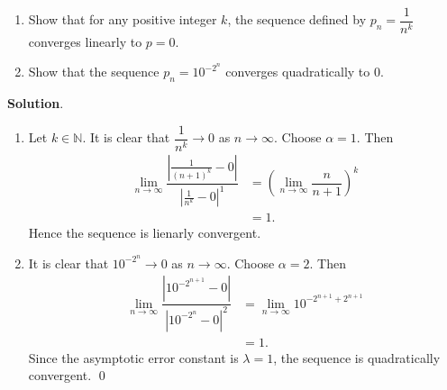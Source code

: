 \documentclass[11pt]{article}
\theoremstyle{break}
\numberwithin{equation}{theorem}
\begin{document}
\newpage
\begin{problem}\label{problem 9}$\ $
    \begin{enumerate}
        \item Show that for any positive integer $k$, the sequence defined by $p_n=\dfrac{1}{n^k}$ converges linearly to $p=0$.
        \item Show that the sequence $p_n=10^{-2^n}$ converges quadratically to $0$.
    \end{enumerate}
\end{problem}
\textbf{Solution}.
\begin{enumerate}
    \item Let $k\in\mathbb{N}$. It is clear that $\dfrac{1}{n^k}\to0$ as $n\to\infty$. Choose $\alpha=1$. Then
    \begin{align*}
        \lim_{n\to\infty}\dfrac{\left\lvert\frac{1}{(n+1)^k}-0\right\rvert}{\left\lvert\frac{1}{n^k}-0\right\rvert^1}&=\left(\lim_{n\to\infty}\dfrac{n}{n+1}\right)^k\\
        &=1.
    \end{align*}
    Hence the sequence is lienarly convergent.
    \item It is clear that $10^{-2^n}\to0$ as $n\to\infty$. Choose $\alpha=2$. Then
    \begin{align*}
        \lim_{n\to\infty}\dfrac{\left\lvert10^{-2^{n+1}}-0\right\rvert}{\left\lvert10^{-2^n}-0\right\rvert^2}&=\lim_{n\to\infty}10^{-2^{n+1}+2^{n+1}}\\
        &=1.
    \end{align*}
    Since the asymptotic error constant is $\lambda=1$, the sequence is quadratically convergent. \qed
\end{enumerate}
\end{document}
